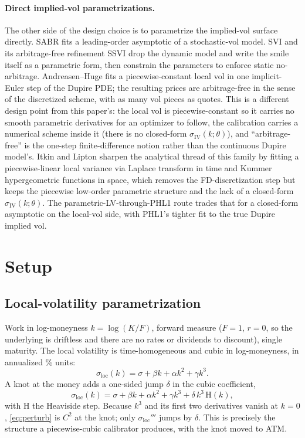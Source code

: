 \documentclass[11pt]{article}
\newcommand{\sloc}{\sigma_{\mathrm{loc}}}
\newcommand{\siv}{\sigma_{\mathrm{IV}}}
\newcommand{\Hev}{\mathrm{H}}
\begin{document}
\paragraph{Direct implied-vol parametrizations.} The other side of the
design choice is to parametrize the implied-vol surface directly. SABR
\citep{hagan2002} fits a leading-order asymptotic of a stochastic-vol
model. SVI \citep{gatheral2004svi} and its arbitrage-free refinement
SSVI \citep{gatheralJacquier2014} drop the dynamic model and write the
smile itself as a parametric form, then constrain the parameters to
enforce static no-arbitrage. Andreasen--Huge \citep{andreasenHuge2011}
fits a piecewise-constant local vol in one implicit-Euler step of the
Dupire PDE; the resulting prices are arbitrage-free in the sense of the
discretized scheme, with as many vol pieces as quotes. This is a
different design point from this paper's: the local vol is piecewise-constant
so it carries no smooth parametric derivatives for an optimizer to
follow, the calibration carries a numerical scheme inside it (there
is no closed-form $\siv(k;\theta)$), and ``arbitrage-free'' is the
one-step finite-difference notion rather than the continuous Dupire
model's. Itkin and Lipton \citep{itkinLipton2018} sharpen the
analytical thread of this family by fitting a piecewise-linear local
variance via Laplace transform in time and Kummer hypergeometric
functions in space, which removes the FD-discretization step but
keeps the piecewise low-order parametric structure and the lack of a
closed-form $\siv(k;\theta)$. The
parametric-LV-through-PHL1 route trades that for a closed-form
asymptotic on the local-vol side, with PHL1's tighter fit to the
true Dupire implied vol.

\section{Setup}

\subsection{Local-volatility parametrization}\label{sec:setup-lv}

Work in log-moneyness $k=\log(K/F)$, forward measure ($F=1$, $r=0$, so
the underlying is driftless and there are no rates or dividends to
discount), single maturity. The local volatility is time-homogeneous and cubic in
log-moneyness, in annualized \% units:
\begin{equation}
\sloc(k) = \sigma + \beta k + \alpha k^2 + \gamma k^3 .
\end{equation}
A knot at the money adds a one-sided jump $\delta$ in the cubic coefficient,
\begin{equation}
\sloc(k) = \sigma + \beta k + \alpha k^2 + \gamma k^3
           + \delta\,k^3\,\Hev(k) ,
\label{eq:perturb}
\end{equation}
with $\Hev$ the Heaviside step. Because $k^3$ and its first two derivatives
vanish at $k=0$, \eqref{eq:perturb} is $C^2$ at the knot; only $\sloc'''$
jumps by $\delta$. This is precisely the structure a piecewise-cubic
calibrator produces, with the knot moved to ATM.
\end{document}
